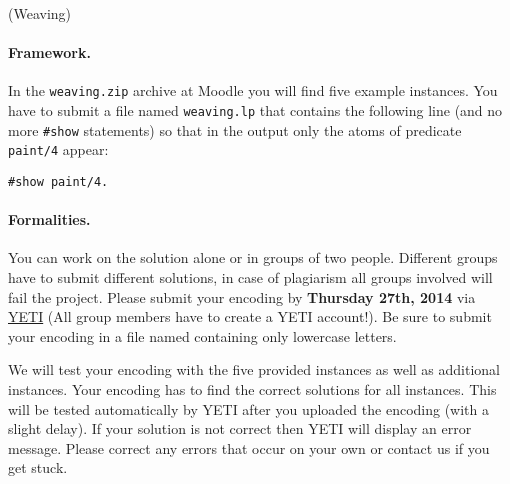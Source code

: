 \documentclass[a4paper,12pt]{article}
\begin{document}
\begin{PraktikumsAufgabe}{2}{(Weaving)}
\paragraph{Framework.}

\noindent
In the
{\texttt{weaving.zip}}
archive at Moodle you will find five example instances.
You have to submit a file named \texttt{weaving.lp} that contains the following line 
(and no more \texttt{\#show} statements)
so that in the output only the atoms of predicate \texttt{paint/4} appear:
\vspace{-1.5mm}
\begin{verbatim}
#show paint/4.
\end{verbatim}
\vspace{-1mm}

\noindent

\paragraph{Formalities.}
%
You can work on the solution alone or in groups of two people.
Different groups have to submit different solutions, 
in case of plagiarism all groups involved will fail the project.
Please submit your encoding by \textbf{Thursday 27th, 2014} via
\href{https://yeti.haiti.cs.uni-potsdam.de}{YETI}
(All group members have to create a YETI account!).
Be sure to submit your encoding in a file named 
containing only lowercase letters.

\noindent
We will test your encoding with the five provided instances as well as additional instances.
Your encoding has to find the correct solutions for all instances.
This will be tested automatically by YETI after you uploaded the encoding (with a slight delay).
If your solution is not correct then YETI will display an error message.
Please correct any errors that occur on your own or contact us if you get stuck.


\end{PraktikumsAufgabe}
\end{document}
